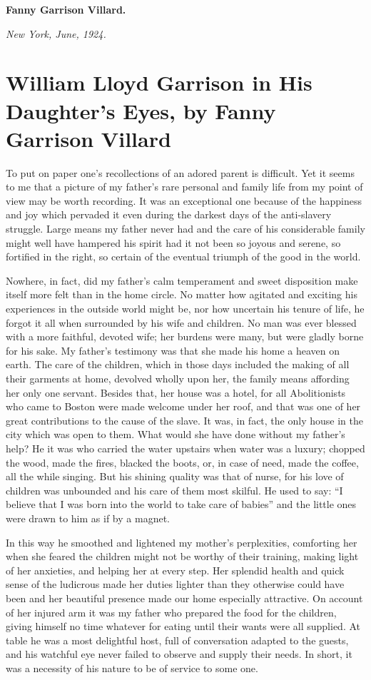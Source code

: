 \documentclass{book}
\begin{document}
\textbf{Fanny Garrison Villard.}

\emph{New York, June, 1924.}

\chapter{William Lloyd Garrison in His Daughter’s Eyes, by Fanny Garrison Villard}
\label{chapter-1}
To put on paper one’s recollections of an adored parent is difficult. Yet it seems to me that a picture of my father’s rare personal and family life from my point of view may be worth recording. It was an exceptional one because of the happiness and joy which pervaded it even during the darkest days of the anti-slavery struggle. Large means my father never had and the care of his considerable family might well have hampered his spirit had it not been so joyous and serene, so fortified in the right, so certain of the eventual triumph of the good in the world.

Nowhere, in fact, did my father’s calm temperament and sweet disposition make itself more felt than in the home circle. No matter how agitated and exciting his experiences in the outside world might be, nor how uncertain his tenure of life, he forgot it all when surrounded by his wife and children. No man was ever blessed with a more faithful, devoted wife; her burdens were many, but were gladly borne for his sake. My father’s testimony was that she made his home a heaven on earth. The care of the children, which in those days included the making of all their garments at home, devolved wholly upon her, the family means affording her only one servant. Besides that, her house was a hotel, for all Abolitionists who came to Boston were made welcome under her roof, and that was one of her great contributions to the cause of the slave. It was, in fact, the only house in the city which was open to them. What would she have done without my father’s help? He it was who carried the water upstairs when water was a luxury; chopped the wood, made the fires, blacked the boots, or, in case of need, made the coffee, all the while singing. But his shining quality was that of nurse, for his love of children was unbounded and his care of them most skilful. He used to say: “I believe that I was born into the world to take care of babies” and the little ones were drawn to him as if by a magnet.

In this way he smoothed and lightened my mother’s perplexities, comforting her when she feared the children might not be worthy of their training, making light of her anxieties, and helping her at every step. Her splendid health and quick sense of the ludicrous made her duties lighter than they otherwise could have been and her beautiful presence made our home especially attractive. On account of her injured arm it was my father who prepared the food for the children, giving himself no time whatever for eating until their wants were all supplied. At table he was a most delightful host, full of conversation adapted to the guests, and his watchful eye never failed to observe and supply their needs. In short, it was a necessity of his nature to be of service to some one.
\end{document}
